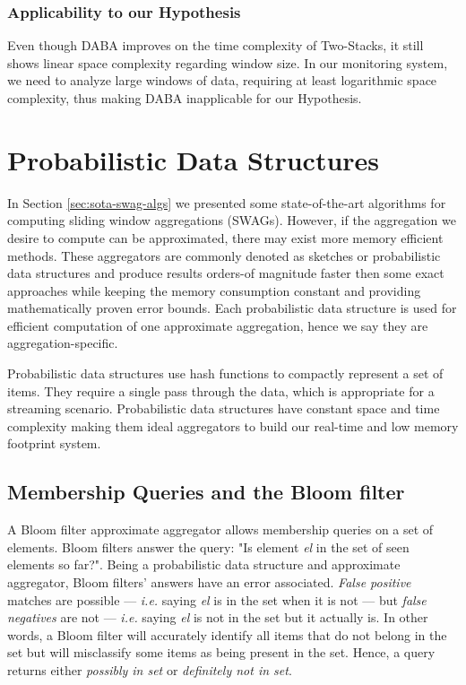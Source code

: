 \subsubsection*{Applicability to our Hypothesis}
Even though DABA improves on the time complexity of Two-Stacks, it still shows linear space complexity regarding window size. In our monitoring system, we need to analyze large windows of data, requiring at least logarithmic space complexity, thus making DABA inapplicable for our Hypothesis.

\section{Probabilistic Data Structures} \label{sec:pds}
In Section \ref{sec:sota-swag-algs} we presented some state-of-the-art algorithms for computing sliding window aggregations (SWAGs). However, if the aggregation we desire to compute can be approximated, there may exist more memory efficient methods. These aggregators are commonly denoted as sketches or probabilistic data structures and produce results orders-of magnitude faster then some exact approaches while keeping the memory consumption constant and providing mathematically proven error bounds. Each probabilistic data structure is used for efficient computation of one approximate aggregation, hence we say they are aggregation-specific.

Probabilistic data structures use hash functions to compactly represent a set of items. They require a single pass through the data, which is appropriate for a streaming scenario. Probabilistic data structures have constant space and time complexity \cite{Singh-PDS-BIGD} making them ideal aggregators to build our real-time and low memory footprint system. 

\subsection{Membership Queries and the Bloom filter} \label{sec:bloom}
A Bloom filter \cite{BLOOM-BLOOMFILTER} approximate aggregator allows membership queries on a set of elements. Bloom filters answer the query: "Is element \textit{el} in the set of seen elements so far?". Being a probabilistic data structure and approximate aggregator, Bloom filters' answers have an error associated. \textit{False positive} matches are possible --- \textit{i.e.} saying \textit{el} is in the set when it is not --- but \textit{false negatives} are not --- \textit{i.e.} saying \textit{el} is not in the set but it actually is. In other words, a Bloom filter will accurately identify all items that do not belong in the set but will misclassify some items as being present in the set. Hence, a query returns either \textit{possibly in set} or \textit{definitely not in set}.

